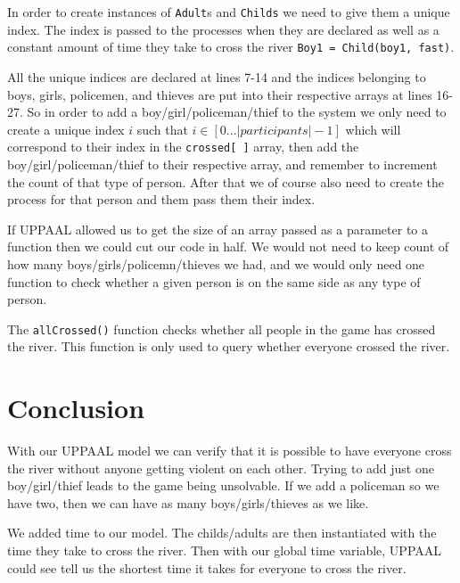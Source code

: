 \documentclass[a4paper,12pt]{article}
\begin{document}
In order to create instances of \lstinline|Adult|s and \lstinline|Childs| we need to give them a unique index. The index is passed to the processes when they are declared as well as a constant amount of time they take to cross the river \lstinline|Boy1 = Child(boy1, fast)|.

All the unique indices are declared at lines 7-14 and the indices belonging to boys, girls, policemen, and thieves are put into their respective arrays at lines 16-27. So in order to add a boy/girl/policeman/thief to the system we only need to create a unique index $i$ such that $i \in [0 ... |participants|-1]$ which will correspond to their index in the \lstinline|crossed[ ]| array, then add the boy/girl/policeman/thief to their respective array, and remember to increment the count of that type of person. After that we of course also need to create the process for that person and them pass them their index.

If UPPAAL allowed us to get the size of an array passed as a parameter to a function then we could cut our code in half. We would not need to keep count of how many boys/girls/policemn/thieves we had, and we would only need one function to check whether a given person is on the same side as any type of person.

The \lstinline|allCrossed()| function checks whether all people in the game has crossed the river. This function is only used to query whether everyone crossed the river.

\section*{Conclusion}

With our UPPAAL model we can verify that it is possible to have everyone cross the river without anyone getting violent on each other. Trying to add just one boy/girl/thief leads to the game being unsolvable. If we add a policeman so we have two, then we can have as many boys/girls/thieves as we like.

We added time to our model. The childs/adults are then instantiated with the time they take to cross the river. Then with our global time variable, UPPAAL could see tell us the shortest time it takes for everyone to cross the river.
\end{document}
